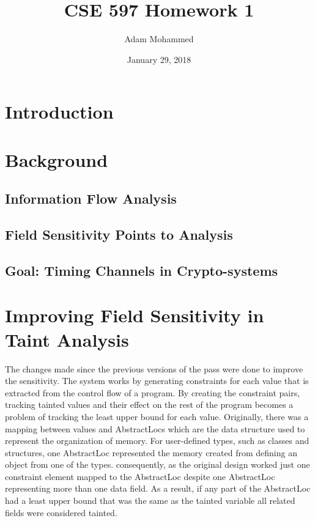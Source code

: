 \documentclass[11pt,a4paper]{article}
\title{CSE 597 Homework 1\vspace{-1ex}}
\author{Adam Mohammed}
\date{\vspace{-1ex}January 29, 2018}
\begin{document}
\section{Introduction}
%
\section{Background}
\subsection{Information Flow Analysis}
\subsection{Field Sensitivity Points to Analysis}
\subsection{Goal: Timing Channels in Crypto-systems}

\section{Improving Field Sensitivity in Taint Analysis}

  The changes made since the previous versions of the pass were done to improve
  the sensitivity. The system works by generating constraints for each value that
  is extracted from the control flow of a program. By creating the constraint
  pairs, tracking tainted values and their effect on  the rest of the program
  becomes a problem of tracking the least upper bound for each value.  Originally,
  there was a mapping between values and AbstractLocs which are the data structure
  used to represent the organization of memory. For user-defined types, such as
  classes and structures, one AbstractLoc represented the memory created from
  defining an object from one of the types. consequently, as the original design
  worked just one constraint element mapped to the AbstractLoc despite one
  AbstractLoc representing more than one data field. As a result, if any part of
  the AbstractLoc had a least upper bound that was the same as the tainted
  variable all related fields were considered tainted.
\end{document}
